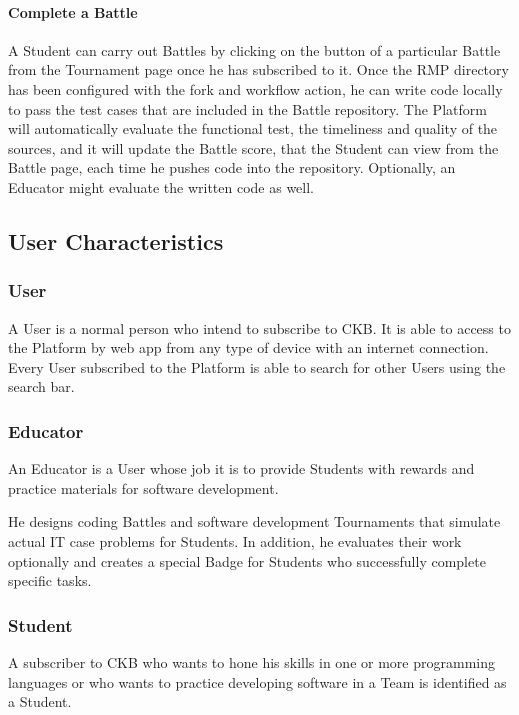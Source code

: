 \paragraph{Complete a Battle}
A Student can carry out Battles by clicking on the button of a particular Battle from the Tournament page once he has subscribed to it. Once the RMP directory has been configured with the fork and workflow action, he can write code 
locally to pass the test cases that are included in the Battle repository. The Platform will automatically evaluate the functional test, the timeliness and quality of the sources, and it will update the Battle score, that the Student 
can view from the Battle page, each time he pushes code into the repository. Optionally, an Educator might evaluate the written code as well.

\subsection{User Characteristics}
\subsubsection{User}
A User is a normal person who intend to subscribe to CKB. It is able to access to the Platform by web app from any type of device with an internet connection.\\
Every User subscribed to the Platform is able to search for other Users using the search bar.

\subsubsection{Educator}
An Educator is a User whose job it is to provide Students with rewards and practice materials for software development.

He designs coding Battles and software development Tournaments that simulate actual IT case problems for Students. In addition, he evaluates their work optionally and creates a special Badge for Students who successfully complete 
specific tasks.

\subsubsection{Student}
A subscriber to CKB who wants to hone his skills in one or more programming languages or who wants to practice developing software in a Team is identified as a Student.

